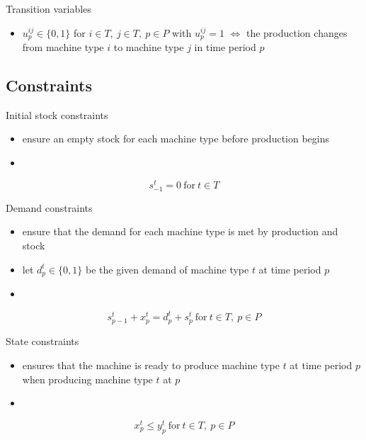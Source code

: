 \documentclass{beamer}
\begin{document}
  \begin{frame}{Transition variables}
    \begin{itemize}
      \item $u^{ij}_p \in \{0,1\}$ for $i \in T,~j \in T,~p \in P$
        with $u^{ij}_p = 1$ $\Leftrightarrow$ the production changes
        from machine type $i$ to machine type $j$ in time period $p$
    \end{itemize}
  \end{frame}

  \subsection{Constraints}
  \begin{frame}{Initial stock constraints}
    \begin{itemize}
    \item ensure an empty stock for each machine type before production begins
    \item[]
    \end{itemize}
    \begin{equation}s^{t}_{-1} = 0~\text{for}~t \in T\label{stock-cons}\end{equation}
  \end{frame}

  \begin{frame}{Demand constraints}
    \begin{itemize}
      \item ensure that the demand for each machine type is met by
        production and stock
      \item let $d^t_p \in \{0,1\}$ be the given demand of machine
        type $t$ at time period $p$
      \item[]
    \end{itemize}
    \begin{equation}s^t_{p-1} + x^t_p = d^t_p + s^t_p~\text{for}~t \in T,~p \in P\label{demand-cons}\end{equation}
  \end{frame}

  \begin{frame}{State constraints}
    \begin{itemize}
      \item ensures that the machine is ready to produce machine type
        $t$ at time period $p$ when producing machine type $t$ at $p$
        \item[]
    \end{itemize}
    \begin{equation}x^t_p \leq y^t_p~\text{for}~t \in T,~p \in P\label{state-cons}\end{equation}
  \end{frame}
\end{document}

